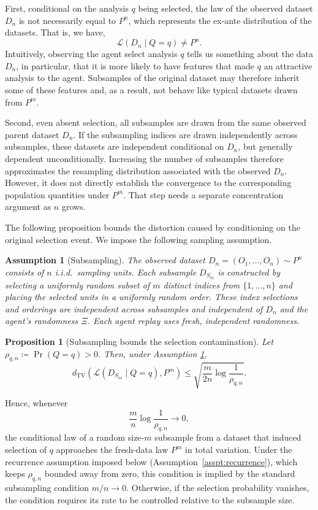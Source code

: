 \documentclass[10pt]{article}
\newtheorem{proposition}{Proposition}
\newtheorem{assumption}{Assumption}
\begin{document}
First, conditional on the analysis $q$ being selected, the law of the observed dataset $D_n$ is not necessarily equal to $P^n$, which represents the ex-ante distribution of the datasets. That is, we have,
\[
\mathcal L(D_n\mid Q=q) \neq P^n.
\]
Intuitively, observing the agent select analysis $q$ tells us something about the data $D_n$, in particular, that it is more likely to have features that made $q$ an attractive analysis to the agent. Subsamples of the original dataset may therefore inherit some of these features and, as a result, not behave like typical datasets drawn from $P^m$.

Second, even absent selection, all subsamples are drawn from the same observed parent dataset $D_n$. If the subsampling indices are drawn independently across subsamples, these datasets are independent conditional on $D_n$, but generally dependent unconditionally. Increasing the number of subsamples therefore approximates the resampling distribution associated with the observed $D_n$. However, it does not directly establish the convergence to the corresponding population quantities under $P^m$. That step needs a separate concentration argument as $n$ grows.

The following proposition bounds the distortion caused by conditioning on the original selection event. We impose the following sampling assumption.

\begin{assumption}[Subsampling]\label{asspt:sampling_units}
The observed dataset $D_n=(O_1,\dots,O_n)\sim P^n$ consists of $n$ i.i.d.\ sampling units. Each subsample $D_{S_m}$ is constructed by selecting a uniformly random subset of $m$ distinct indices from $\{1,\dots,n\}$ and placing the selected units in a uniformly random order. These index selections and orderings are independent across subsamples and independent of $D_n$ and the agent's randomness $\Xi$. Each agent replay uses fresh, independent randomness.
\end{assumption}

\begin{proposition}[Subsampling bounds the selection contamination] \label{prop:subsampling_selection}
  Let $\rho_{q,n} \coloneqq \Pr(Q=q) > 0$. Then, under Assumption \ref{asspt:sampling_units},
    \[
d_{\mathrm{TV}}
\left(
\mathcal L(D_{S_m}\mid Q=q),
P^m
\right)
\leq
\sqrt{
\frac{m}{2n}
\log\frac{1}{\rho_{q,n}}
}.
\]
\end{proposition}

Hence, whenever
\[
\frac{m}{n}\log\frac{1}{\rho_{q,n}}
\to 0,
\]
the conditional law of a random size-$m$ subsample from a dataset that induced selection of $q$ approaches the fresh-data law $P^m$ in total variation. Under the recurrence assumption imposed below (Assumption~\ref{asspt:recurrence}), which keeps $\rho_{q,n}$ bounded away from zero, this condition is implied by the standard subsampling condition $m/n\to 0$. Otherwise, if the selection probability vanishes, the condition requires its rate to be controlled relative to the subsample size.
\end{document}
